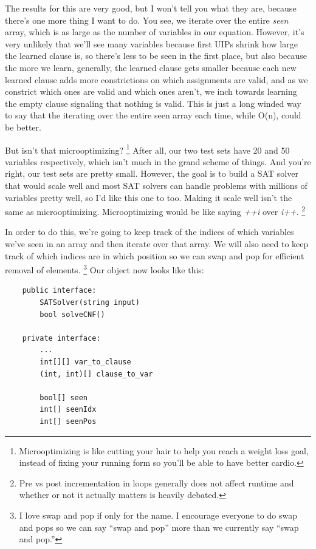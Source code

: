 \documentclass[oneside]{book}
\begin{document}
The results for this are very good, but I won't tell you what they are, because there's 
one more thing I want to do. You see, we iterate over the entire \textit{seen} array,
which is as large as the number of variables in our equation. However, it's very unlikely 
that we'll see many variables because first UIPs shrink how large the learned clause is, 
so there's less to be seen in the first place, but also because the more we learn, generally,
the learned clause gets smaller because each new learned clause adds more constrictions on 
which assignments are valid, and as we constrict which ones are valid and which ones aren't,
we inch towards learning the empty clause signaling that nothing is valid. This is just a 
long winded way to say that the iterating over the entire seen array each time, while O(n),
could be better.

But isn't that microoptimizing?
\footnote{Microoptimizing is like cutting your hair to help you reach a weight loss goal, 
instead of fixing your running form so you'll be able to have better cardio.}
After all, our two test sets have 20 and 50 variables 
respectively, which isn't much in the grand scheme of things. And you're right, our test 
sets are pretty small. However, the goal is to build a SAT solver that would scale well 
and most SAT solvers can handle problems with millions of variables pretty well, so I'd 
like this one to too. Making it scale well isn't the same as microoptimizing. Microoptimizing 
would be like saying \textit{++i} over \textit{i++}.
\footnote{Pre vs post incrementation in loops generally does not affect runtime and whether 
or not it actually matters is heavily debated.}

In order to do this, we're going to keep track of the indices of which variables we've
seen in an array and then iterate over that array. We will also need to keep track of 
which indices are in which position so we can swap and pop for efficient removal of 
elements.
\footnote{I love swap and pop if only for the name. I encourage everyone to do swap and 
pops so we can say ``swap and pop'' more than we currently say ``swap and pop.''}
Our object now looks like this:

\begin{lstlisting}
    public interface:
        SATSolver(string input)
        bool solveCNF()

    private interface:
        ...
        int[][] var_to_clause
        (int, int)[] clause_to_var

        bool[] seen
        int[] seenIdx
        int[] seenPos
\end{lstlisting}
\end{document}
